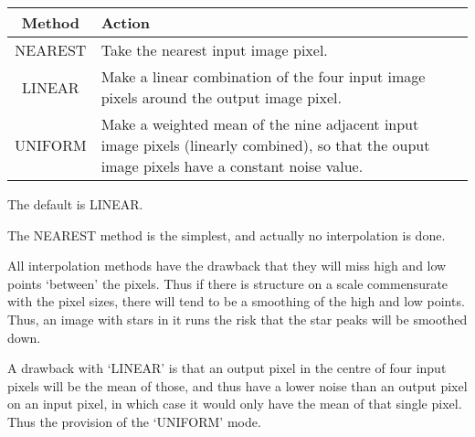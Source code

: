 {{\begin{tabular}{|c|p{4in}|}\hline
  Method & Action \\ \hline                      
  NEAREST  &  Take the nearest input image pixel. \\
  LINEAR   &  Make a linear combination of the four input image
              pixels around the output image pixel. \\
  UNIFORM  &  Make a weighted mean of the nine adjacent input image
              pixels (linearly combined), so that the ouput image pixels
              have a constant noise value.  \\ \hline
\end{tabular}
                                                                               
  The default is LINEAR.
                                                                               
 The NEAREST method is the simplest, and actually no interpolation is
 done.
                                                                               
 All interpolation methods have the drawback that they will miss high
 and low points `between' the pixels. Thus if there is structure on a
 scale commensurate with the pixel sizes, there will tend to be a
 smoothing of the high and low points. Thus, an image with stars in it
 runs the risk that the star peaks will be smoothed down.
                                                                               
 A drawback with `LINEAR' is that an output pixel in the centre of four
 input pixels will be the mean of those, and thus have a lower noise
 than an output pixel on an input pixel, in which case it would only
 have the mean of that single pixel. Thus the provision of the `UNIFORM'
 mode.
                                                                               
}}
